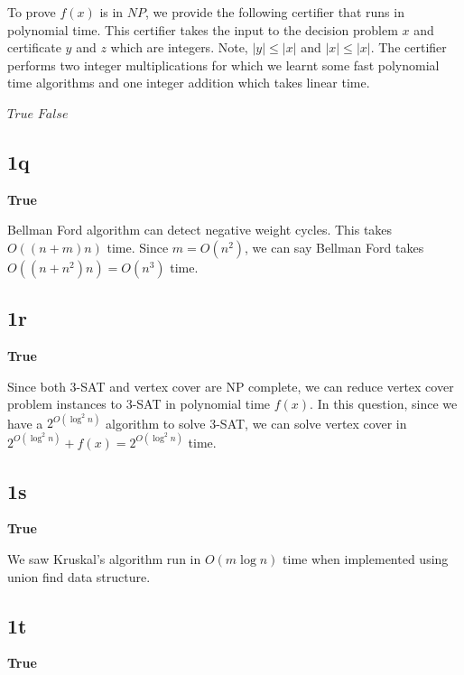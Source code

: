\documentclass{article}
\begin{document}
    To prove $f(x)$ is in $NP$, we provide the following certifier that runs in polynomial time. This certifier takes the input to the decision problem $x$ and certificate $y$ and $z$ which are integers. Note, $|y| \le |x|$ and $|x| \le |x|$. The certifier performs two integer multiplications for which we learnt some fast polynomial time algorithms and one integer addition which takes linear time.

    \begin{algorithm}[H]
        \begin{algorithmic}
                    \State \Return $True$
                \Else
                    \State \Return $False$
                \EndIf
            \EndProcedure
        \end{algorithmic}
    \end{algorithm}

    \subsection*{1q}
    \textbf{True}

    Bellman Ford algorithm can detect negative weight cycles. This takes $O((n+m)n)$ time. Since $m = O(n^2)$, we can say Bellman Ford takes $O((n+n^2)n) = O(n^3)$ time.

    \subsection*{1r}
    \textbf{True}

    Since both 3-SAT and vertex cover are NP complete, we can reduce vertex cover problem instances to 3-SAT in polynomial time $f(x)$. In this question, since we have a $2^{O(\log^2 n)}$ algorithm to solve 3-SAT, we can solve vertex cover in $2^{O(\log^2 n)} + f(x) = 2^{O(\log^2 n)}$ time.

    \subsection*{1s}
    \textbf{True}

    We saw Kruskal's algorithm run in $O(m \log n)$ time when implemented using union find data structure.

    \subsection*{1t}
    \textbf{True}
\end{document}
